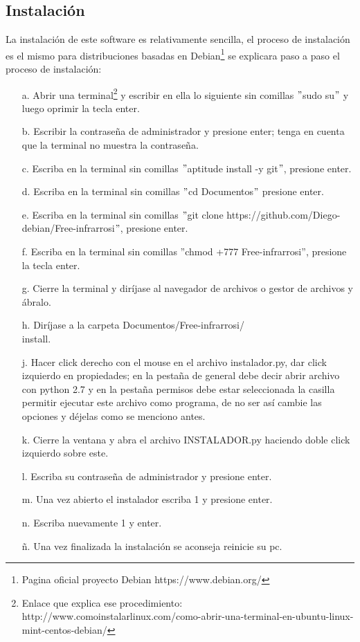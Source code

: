 \documentclass[12]{article}
\begin{document}
\begin{multicols}{2}
\subsection{Instalación}
La instalación de este software es relativamente sencilla, el proceso de instalación es el mismo para distribuciones basadas en Debian\footnote{Pagina oficial proyecto Debian https://www.debian.org/} se  explicara paso a paso el proceso de instalación:
\begin{enumerate}
\item[a.] Abrir una terminal\footnote{Enlace que explica ese procedimiento: http://www.comoinstalarlinux.com/como-abrir-una-terminal-en-ubuntu-linux-mint-centos-debian/} y escribir en ella lo siguiente sin comillas $"$sudo su$"$ y luego oprimir la tecla enter.
\item[b.] Escribir la contraseña de administrador y presione enter; tenga en cuenta que la terminal no muestra la contraseña.
\item[c.] Escriba en la terminal sin comillas $"$aptitude install -y git$"$, presione enter.
\item[d.] Escriba en la terminal sin comillas $"$cd Documentos$"$ presione enter.
\item[e.] Escriba en la terminal sin comillas $"$git clone https://github.com/Diego-debian/Free-infrarrosi$"$, presione enter.
\item[f.] Escriba en la terminal sin comillas $”$chmod +777 Free-infrarrosi$”$, presione la tecla enter.
\item[g.] Cierre la terminal y diríjase al navegador de archivos o gestor de archivos y ábralo.
\item[h.] Diríjase a la carpeta Documentos/Free-infrarrosi/\\install.
\item[j.] Hacer click derecho con el mouse en el archivo instalador.py,  dar click izquierdo en propiedades; en la pestaña de general debe decir abrir archivo con python 2.7 y en la pestaña permisos debe estar seleccionada la casilla permitir ejecutar este archivo como programa, de no ser así cambie las opciones y déjelas como se menciono antes.
\item[k.] Cierre la ventana y abra el archivo INSTALADOR.py haciendo doble click izquierdo sobre este.
\item[l.] Escriba su contraseña de administrador y presione enter.
\item[m.] Una vez abierto el instalador escriba  1 y presione enter.
\item[n.] Escriba nuevamente 1 y enter.
\item[ñ.] Una vez finalizada la instalación se aconseja reinicie su pc.
\end{enumerate}


\end{multicols}
\end{document}
